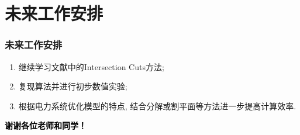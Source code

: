 \documentclass[10pt]{beamer}
\begin{document}
\section{未来工作安排}
\begin{frame}
	\frametitle{未来工作安排} 
	\begin{enumerate}
		\item 继续学习文献中的Intersection Cuts方法;
		\item 复现算法并进行初步数值实验;
		\item 根据电力系统优化模型的特点, 结合分解或割平面等方法进一步提高计算效率.
	\end{enumerate}
\end{frame}

\begin{frame}
	\vspace{1em}
	\centering
	\textcolor{black}{\LARGE\bf 谢谢各位老师和同学！}

\end{frame}
\end{document}
